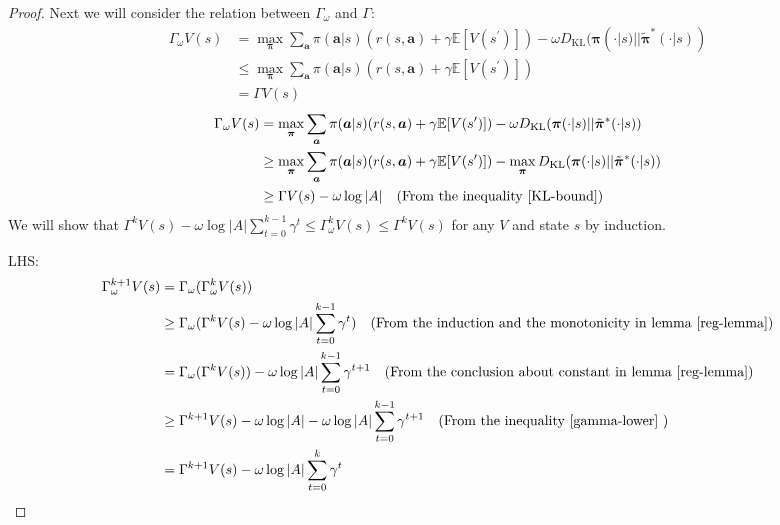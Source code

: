 \documentclass{article}
\begin{document}
\begin{proof}
	    Next we will consider the relation between $\Gamma_\omega$ and $\Gamma$:
	    \begin{equation}
	        \begin{split}
	            \Gamma_\omega V(s) & = \max_{\bm{\pi}} \sum_{\bm{a}} \pi(\bm{a}|s) (r(s,\bm{a}) + \gamma \mathbb{E}[V(s^\prime)] ) - \omega D_{\operatorname{KL}}(\bm{\pi}(\cdot|s) || \tilde{\bm{\pi}}^*(\cdot|s) ) \\
	            & \le \max_{\bm{\pi}} \sum_{\bm{a}} \pi(\bm{a}|s) (r(s,\bm{a}) + \gamma \mathbb{E}[V(s^\prime)])  \\
	            & = \Gamma  V(s)
	        \end{split}
	        \label{gamma-upper}
	    \end{equation}
	    \begin{equation}
	        \begin{split}
	            \Gamma_\omega V(s) & = \max_{\bm{\pi}} \sum_{\bm{a}} \pi(\bm{a}|s) (r(s,\bm{a}) + \gamma \mathbb{E}[V(s^\prime)] ) - \omega D_{\operatorname{KL}}(\bm{\pi}(\cdot|s) || \tilde{\bm{\pi}}^*(\cdot|s) ) \\
	            & \ge \max_{\bm{\pi}} \sum_{\bm{a}} \pi(\bm{a}|s) (r(s,\bm{a}) + \gamma \mathbb{E}[V(s^\prime)]) - \max_{\bm{\pi}} D_{\operatorname{KL}}(\bm{\pi}(\cdot|s) || \tilde{\bm{\pi}}^*(\cdot|s) )   \\
	            & \ge \Gamma  V(s) - \omega \log |A| \quad (\text{From the inequality \eqref{KL-bound}} )
	        \end{split}
	        \label{gamma-lower}
	    \end{equation}
	    We will show that $\Gamma^k V(s) - \omega \log |A| \sum_{t=0}^{k - 1}\gamma^t \le \Gamma_\omega^k V(s) \le \Gamma^k V(s)$ for any $V$ and state $s$ by induction.
	
	LHS:
	\begin{align*}
	    \Gamma_\omega^{k + 1} V(s) & = \Gamma_\omega (\Gamma_\omega^{k} V(s)) \\
	    & \ge \Gamma_\omega(\Gamma^{k} V(s) - \omega \log |A| \sum_{t=0}^{k - 1}\gamma^t ) \quad (\text{From the induction and the monotonicity in lemma \ref{reg-lemma}} ) \\
	    & = \Gamma_\omega(\Gamma^{k} V(s)) -  \omega \log |A| \sum_{t=0}^{k - 1}\gamma^{t + 1}  \quad (\text{From the conclusion about constant in lemma \ref{reg-lemma}} ) \\
	    & \ge \Gamma^{k + 1} V(s) -  \omega \log |A|  -  \omega \log |A| \sum_{t=0}^{k - 1}\gamma^{t + 1}  \quad (\text{From the inequality \ref{gamma-lower} } ) \\
	    & = \Gamma^{k + 1} V(s) -\omega \log |A| \sum_{t=0}^{k}\gamma^{t}
	\end{align*}
	

\end{proof}
\end{document}
